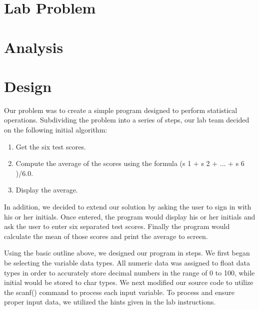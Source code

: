 \documentclass{article}
\begin{document}
\begin{normalsize} %
\color{gvbgdark}

\section*{Lab Problem} 



\vskip 0.25in
\section*{Analysis}



\vskip 0.25in
\section*{Design}


Our problem was to create a simple program designed to perform statistical
operations. Subdividing the problem into a series of steps, our lab team decided on the
following initial algorithm: \par 
\begin{enumerate}\color{gvblue}
	\item Get the six test scores. 
	\item Compute the average of the scores using the formula (s 1 + s 2 + ... + s 6 )/6.0. 
	\item Display the average. 
\end{enumerate}
In addition, we decided to extend our solution by asking the user to sign in with his or her
initials. Once entered, the program would display his or her initials and ask the user to
enter six separated test scores. Finally the program would calculate the mean of those
scores and print the average to screen. \par
Using the basic outline above, we designed our program in steps. We first began
be selecting the variable data types. All numeric data was assigned to float data types
in order to accurately store decimal numbers in the range of 0 to 100, while initial would
be stored to char types. We next modified our source code to utilize the scanf()
command to process each input variable. To process and ensure proper input data, we
utilized the hints given in the lab instructions.



\end{normalsize}
\end{document}
